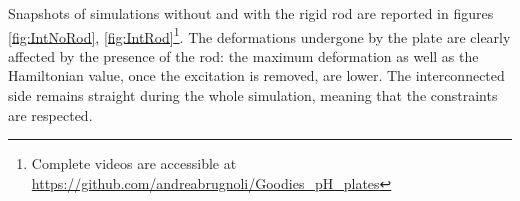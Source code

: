 \documentclass[letterpaper, 10 pt, conference]{ieeeconf}
\begin{document}
Snapshots of simulations without and with the rigid rod are reported in figures \ref{fig:IntNoRod}, \ref{fig:IntRod}\footnote{\label{note:1}Complete videos are accessible at \url{https://github.com/andreabrugnoli/Goodies_pH_plates}}. The deformations undergone by the plate are clearly affected by the presence of the rod: the maximum deformation as well as the Hamiltonian value, once the excitation is removed, are lower. The interconnected side remains straight during the whole simulation, meaning that the constraints are respected.

\begin{figure*}[ht]
	\centering
	\hfil
	\hfil
	\caption{Snapshots at 4 different times ($t_{\text{end}} = 10 \,[ms]$) of a cantilever plate undergoing solicitation \eqref{eq:force_rod}.}
	\label{fig:IntNoRod}
\end{figure*}

\begin{figure*}[t]
	\centering
	\hfil
	\hfil
	\caption{Snapshots at 4 different times ($t_{\text{end}} = 10 \,[ms]$) of a cantilever plate undergoing solicitation \eqref{eq:force_rod}. The plate is connected to a rigid rod in $x = L_x$. Note the different deformation amplitude with respect to \ref{fig:IntNoRod}}
	\label{fig:IntRod}
\end{figure*}
\end{document}
